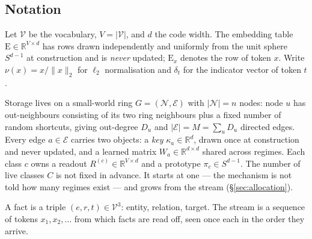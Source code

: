\documentclass[11pt,a4paper]{article}
\begin{document}
\subsection{Notation}

Let $\mathcal{V}$ be the vocabulary, $V=|\mathcal{V}|$, and $d$ the code width.
The embedding table $\mathrm{E}\in\mathbb{R}^{V\times d}$ has rows drawn
independently and uniformly from the unit sphere $S^{d-1}$ at construction and
is \emph{never} updated; $\mathrm{E}_x$ denotes the row of token $x$. Write
$\nu(x)=x/\lVert x\rVert_2$ for $\ell_2$ normalisation and $\delta_t$ for the
indicator vector of token $t$.

Storage lives on a small-world ring $G=(\mathcal{N},\mathcal{E})$ with
$|\mathcal{N}|=n$ nodes: node $u$ has out-neighbours consisting of its two ring
neighbours plus a fixed number of random shortcuts, giving out-degree $D_u$ and
$|\mathcal{E}|=M=\sum_u D_u$ directed edges. Every edge $a\in\mathcal{E}$
carries two objects: a \emph{key} $\kappa_a\in\mathbb{R}^d$, drawn once at
construction and never updated, and a learned matrix
$W_a\in\mathbb{R}^{d\times d}$ shared across regimes. Each class $c$ owns a
readout $R^{(c)}\in\mathbb{R}^{V\times d}$ and a prototype
$\pi_c\in S^{d-1}$. The number of live classes $C$ is not fixed in advance. It
starts at one --- the mechanism is not told how many regimes exist --- and
grows from the stream (\S\ref{sec:allocation}).

A fact is a triple $(e,r,t)\in\mathcal{V}^3$: entity, relation, target. The
stream is a sequence of tokens $x_1,x_2,\dots$ from which facts are read off,
seen once each in the order they arrive.
\end{document}
